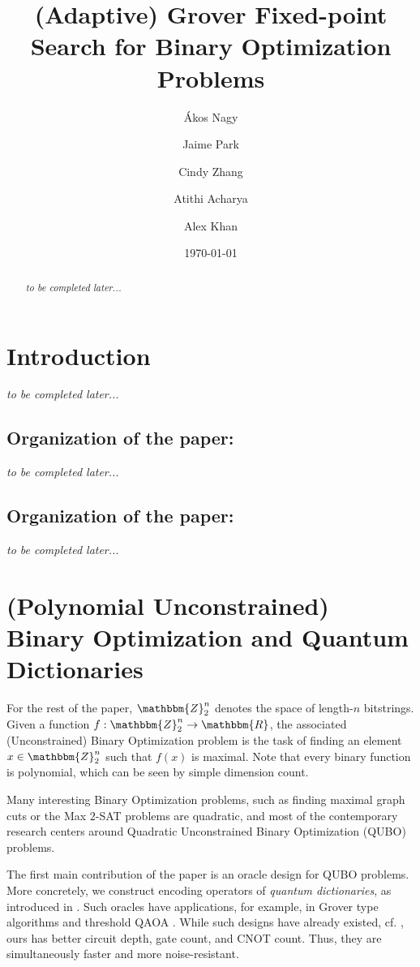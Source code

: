 \documentclass[reqno,10pt]{amsart}
\title{(Adaptive) Grover Fixed-point Search for Binary Optimization Problems}
\date{\today}
\author{\'Akos Nagy}
\author{Jaime Park}
\author{Cindy Zhang}
\author{Atithi Acharya}
\author{Alex Khan}
\numberwithin{equation}{section}                %
\def\rl{\mathbbm{R}}
\def\Z{\mathbbm{Z}}
\begin{document}
\begin{abstract}
	\emph{to be completed later...}
\end{abstract}

\maketitle

\section{Introduction}

\emph{to be completed later...}

\smallskip

\subsection*{Organization of the paper:} \emph{to be completed later...}



\smallskip

\subsection*{Organization of the paper:} \emph{to be completed later...}   

\bigskip

\section{(Polynomial Unconstrained) Binary Optimization and Quantum Dictionaries}
\label{sec:qubos_and_qdicts}

For the rest of the paper, $\Z_2^n$ denotes the space of length-$n$ bitstrings. Given a function $f : \Z_2^n \rightarrow \rl$, the associated (Unconstrained) Binary Optimization problem is the task of finding an element $x \in \Z_2^n$ such that $f (x)$ is maximal. Note that every binary function is polynomial, which can be seen by simple dimension count.

Many interesting Binary Optimization problems, such as finding maximal graph cuts or the Max $2$-SAT problems are quadratic, and most of the contemporary research centers around Quadratic Unconstrained  Binary Optimization (QUBO) problems.

\medskip

The first main contribution of the paper is an oracle design for QUBO problems. More concretely, we construct encoding operators of \emph{quantum dictionaries}, as introduced in \cite{gilliam_foundational_2021}. Such oracles have applications, for example, in Grover type algorithms and threshold QAOA \cite{golden_threshold_2021}. While such designs have already existed, cf. \cite{gilliam_grover_2021}, ours has better circuit depth, gate count, and CNOT count. Thus, they are simultaneously faster and more noise-resistant.
\end{document}
